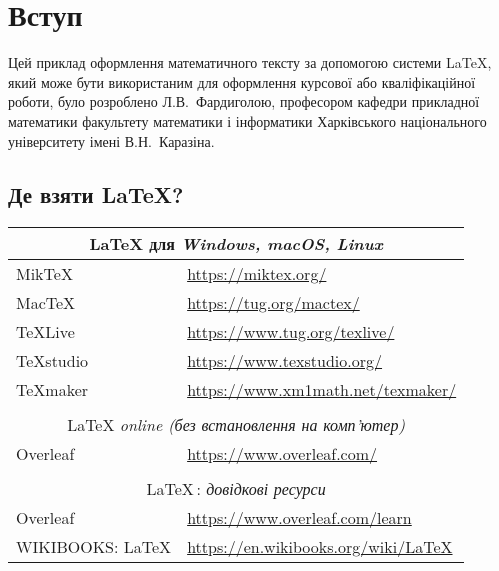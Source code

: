 \chapter*{Вступ}



Цей приклад оформлення математичного тексту за допомогою системи \LaTeX, який може бути використаним для оформлення курсової або кваліфікаційної роботи, було розроблено Л.В.~Фардиголою, професором кафедри прикладної математики факультету математики і інформатики Харківського національного університету імені В.Н.~Каразіна.

\section*{Де взяти \LaTeX?}

\begin{center}
	\begin{tabular*}{\textwidth}{ll}
		\multicolumn{2}{c}{\large \LaTeX{} для \slshape Windows, macOS, Linux}\\
		\hline
		\color{darkblue} MikTeX &  \url{https://miktex.org/}   \\
		\color{darkblue} MacTeX & 
		\url{https://tug.org/mactex/}\\
		\color{darkblue} TeXLive &  \url{https://www.tug.org/texlive/} \\
		\hline
		\color{violet} TeXstudio & \color{blue} \url{https://www.texstudio.org/}  \\
		\color{violet} TeXmaker & \color{blue} \url{https://www.xm1math.net/texmaker/}\\ 
		\hline
		\\
		\multicolumn{2}{c}{\large \LaTeX{} \slshape online (без встановлення на комп'ютер)}
		\\
		\hline
		\color{darkgreen} Overleaf & \color{blue} \url{https://www.overleaf.com/} \\
		\hline
		\\
		\multicolumn{2}{c}{\large \LaTeX\,: \slshape довідкові ресурси}
		\\
		\hline
		\color{darkgreen} Overleaf & \color{blue} \url{https://www.overleaf.com/learn}\\
		\hline
		\color{khaki} WIKIBOOKS: \LaTeX & \color{blue}
		\url{https://en.wikibooks.org/wiki/LaTeX}\\
		\hline
	\end{tabular*}
\end{center}	

